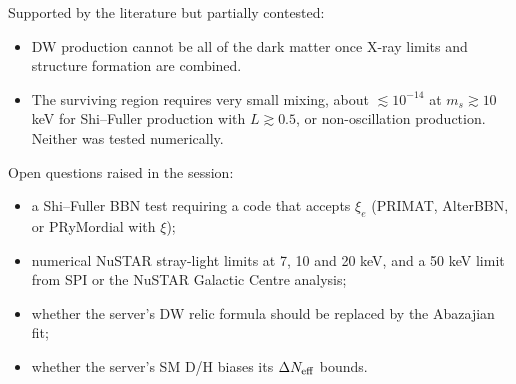 \documentclass[11pt,a4paper]{article}
\begin{document}
Supported by the literature but partially contested:
\begin{itemize}
\item DW production cannot be all of the dark matter once X-ray limits and structure formation are combined.
\item The surviving region requires very small mixing, about $\lesssim10^{-14}$ at $m_s\gtrsim10$ keV for Shi--Fuller production with $L\gtrsim0.5$, or non-oscillation production. Neither was tested numerically.
\end{itemize}

Open questions raised in the session:
\begin{itemize}
\item a Shi--Fuller BBN test requiring a code that accepts $\xi_e$ (PRIMAT, AlterBBN, or PRyMordial with $\xi$);
\item numerical NuSTAR stray-light limits at 7, 10 and 20 keV, and a 50 keV limit from SPI or the NuSTAR Galactic Centre analysis;
\item whether the server's DW relic formula should be replaced by the Abazajian fit;
\item whether the server's SM D/H biases its $\Delta N_{\rm eff}$ bounds.
\end{itemize}
\end{document}
